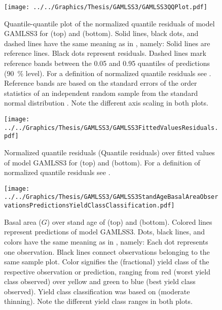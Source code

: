 \begin{figure}[h]
  \centering
  \texttt{[image: ../../Graphics/Thesis/GAMLSS3/GAMLSS3QQPlot.pdf]}
  \caption{Quantile-quantile plot of the normalized quantile residuals of model GAMLSS3 for \Beech{} (top) and \Spruce{} (bottom). Solid lines, black dots, and dashed lines have the same meaning as in , namely:  Solid lines are reference lines.  Black dots represent residuals.  Dashed lines mark reference bands between the \num{0.05} and \num{0.95} quantiles of predictions (\SI{90}{\percent} level).  For a definition of normalized quantile residuals see \textcite{Dunn1996}.  Reference bands are based on the standard errors of the order statistics of an independent random sample from the standard normal distribution \parencite{Fox2016}.  Note the different axis scaling in both plots.}
  \label{fig:GAMLSS3QQPlot}
\end{figure}

\begin{figure}[h]
  \centering
  \texttt{[image: ../../Graphics/Thesis/GAMLSS3/GAMLSS3FittedValuesResiduals.pdf]}
  \caption{Normalized quantile residuals (Quantile residuals) over fitted values of model GAMLSS3 for \Beech{} (top) and \Spruce{} (bottom).  For a definition of normalized quantile residuals see \textcite{Dunn1996}.}
  \label{fig:GAMLSS3FittedValuesResiduals}
\end{figure}

\begin{figure}[h]
  \centering
  \texttt{[image: ../../Graphics/Thesis/GAMLSS3/GAMLSS3StandAgeBasalAreaObservationsPredictionsYieldClassClassification.pdf]}
  \caption{Basal area (\(G\)) over stand age of \Beech{} (top) and \Spruce{} (bottom).  Colored lines represent predictions of model GAMLSS3.  Dots, black lines, and colors have the same meaning as in , namely:  Each dot represents one observation.  Black lines connect observations belonging to the same sample plot.  Color signifies the (fractional) yield class of the respective observation or prediction, ranging from red (worst yield class observed) over yellow and green to blue (best yield class observed). Yield class classification was based on \textcite{Schober1995} (moderate thinning).  Note the different yield class ranges in both plots.}
  \label{fig:GAMLSS3StandAgeBasalAreaObservationsPredictionsYieldClassClassification}
\end{figure}

